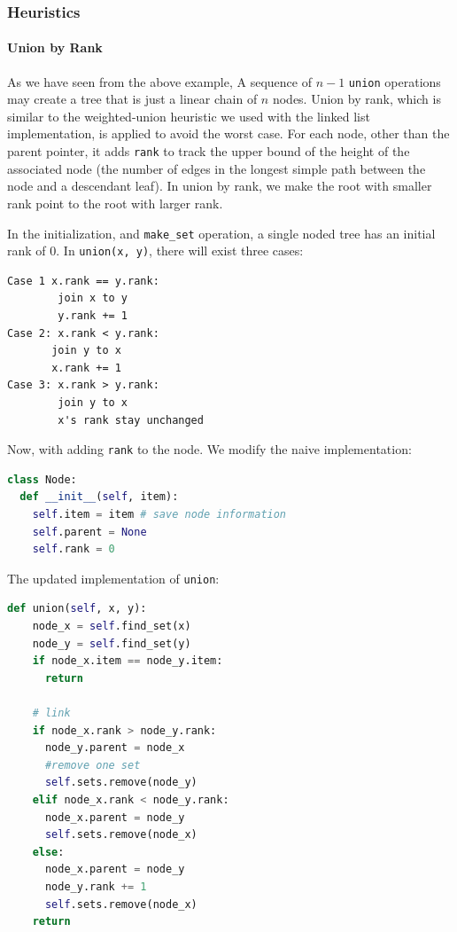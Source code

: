 \documentclass[../main.tex]{subfiles}
\begin{document}
\subsubsection{Heuristics}
\paragraph{Union by Rank}
As we have seen from the above example, A sequence of $n-1$ \texttt{union} operations may create a tree that is just a linear chain of $n$ nodes. Union by rank, which is similar to the weighted-union heuristic we used with the linked list implementation, is applied to avoid the worst case.  For each node, other than the parent pointer, it adds \texttt{rank} to track the upper bound of the height of the associated node (the number of edges in the longest simple path between the node and a descendant leaf). In union by rank, we make the root with smaller rank point to the root with larger rank. 

In the initialization, and \texttt{make\_set} operation, a single noded tree has an initial rank of 0. In \texttt{union(x, y)}, there will exist three cases:
\begin{lstlisting}[numbers=none]
Case 1 x.rank == y.rank: 
        join x to y
        y.rank += 1
Case 2: x.rank < y.rank:
       join y to x
       x.rank += 1
Case 3: x.rank > y.rank:
        join y to x
        x's rank stay unchanged
\end{lstlisting}
Now, with adding \texttt{rank} to the node. We modify the naive implementation:
\begin{lstlisting}[language=Python]
class Node:
  def __init__(self, item):
    self.item = item # save node information
    self.parent = None
    self.rank = 0
\end{lstlisting}
The updated implementation of \texttt{union}:
\begin{lstlisting}[language=Python]
  def union(self, x, y):
    node_x = self.find_set(x)
    node_y = self.find_set(y)
    if node_x.item == node_y.item:
      return
    
    # link
    if node_x.rank > node_y.rank:
      node_y.parent = node_x
      #remove one set
      self.sets.remove(node_y)
    elif node_x.rank < node_y.rank:
      node_x.parent = node_y
      self.sets.remove(node_x)
    else:
      node_x.parent = node_y
      node_y.rank += 1
      self.sets.remove(node_x)
    return 
\end{lstlisting}
\end{document}
